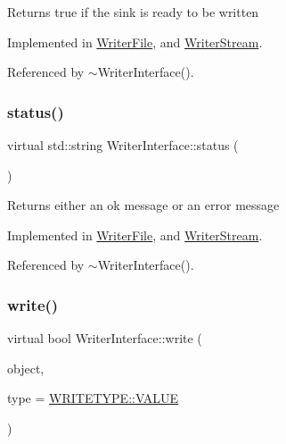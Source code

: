 \begin{DoxyReturn}{Returns}
true if the sink is ready to be written 
\end{DoxyReturn}


Implemented in \hyperlink{classWriterFile_aaa16229f58daf8b74fbe8a59c9b1b166}{Writer\+File}, and \hyperlink{classWriterStream_a32e6913d45c7e67e60c0787c7a3e9467}{Writer\+Stream}.



Referenced by $\sim$\+Writer\+Interface().

\mbox{\label{classWriterInterface_a8865a526bb8c67ff4c96f25fc8217c81}} 
\subsubsection{\texorpdfstring{status()}{status()}}
{\footnotesize\ttfamily virtual std\+::string Writer\+Interface\+::status (\begin{DoxyParamCaption}{ }\end{DoxyParamCaption})\hspace{0.3cm}{\ttfamily [pure virtual]}}

\begin{DoxyReturn}{Returns}
either an ok message or an error message 
\end{DoxyReturn}


Implemented in \hyperlink{classWriterFile_a538dd7bd3be5c0f3b930f215bf9f6ca7}{Writer\+File}, and \hyperlink{classWriterStream_ac5da94332707b311cb43b06c9356afce}{Writer\+Stream}.



Referenced by $\sim$\+Writer\+Interface().

\mbox{\label{classWriterInterface_a2f756ac0b3299f4dbadececad4055424}} 
\subsubsection{\texorpdfstring{write()}{write()}}
{\footnotesize\ttfamily virtual bool Writer\+Interface\+::write (\begin{DoxyParamCaption}\item[{const std\+::string \&}]{object,  }\item[{const \hyperlink{classWriterInterface_af35706b761b016972144a9333637d93d}{W\+R\+I\+T\+E\+T\+Y\+PE} \&}]{type = {\ttfamily \hyperlink{classWriterInterface_af35706b761b016972144a9333637d93daecc2e9c313faddb07e7da223c1dc5c3f}{W\+R\+I\+T\+E\+T\+Y\+P\+E\+::\+V\+A\+L\+UE}} }\end{DoxyParamCaption})\hspace{0.3cm}{\ttfamily [pure virtual]}}


